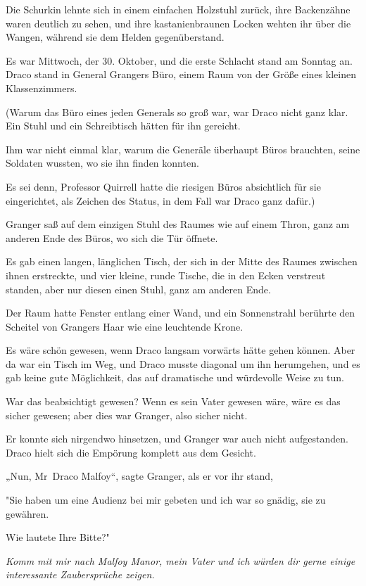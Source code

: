 {Die Schurkin lehnte sich in einem einfachen Holzstuhl zurück, ihre Backenzähne waren deutlich zu sehen, und ihre kastanienbraunen Locken wehten ihr über die Wangen, während sie dem Helden gegenüberstand.

Es war Mittwoch, der 30. Oktober, und die erste Schlacht stand am Sonntag an. Draco stand in General Grangers Büro, einem Raum von der Größe eines kleinen Klassenzimmers.

(Warum das Büro eines jeden Generals so groß war, war Draco nicht ganz klar. Ein Stuhl und ein Schreibtisch hätten für ihn gereicht.

Ihm war nicht einmal klar, warum die Generäle überhaupt Büros brauchten, seine Soldaten wussten, wo sie ihn finden konnten.

Es sei denn, Professor Quirrell hatte die riesigen Büros absichtlich für sie eingerichtet, als Zeichen des Status, in dem Fall war Draco ganz dafür.)

Granger saß auf dem einzigen Stuhl des Raumes wie auf einem Thron, ganz am anderen Ende des Büros, wo sich die Tür öffnete.

Es gab einen langen, länglichen Tisch, der sich in der Mitte des Raumes zwischen ihnen erstreckte, und vier kleine, runde Tische, die in den Ecken verstreut standen, aber nur diesen einen Stuhl, ganz am anderen Ende.

Der Raum hatte Fenster entlang einer Wand, und ein Sonnenstrahl berührte den Scheitel von Grangers Haar wie eine leuchtende Krone.

Es wäre schön gewesen, wenn Draco langsam vorwärts hätte gehen können. Aber da war ein Tisch im Weg, und Draco musste diagonal um ihn herumgehen, und es gab keine gute Möglichkeit, das auf dramatische und würdevolle Weise zu tun.

War das beabsichtigt gewesen? Wenn es sein Vater gewesen wäre, wäre es das sicher gewesen; aber dies war Granger, also sicher nicht.

Er konnte sich nirgendwo hinsetzen, und Granger war auch nicht aufgestanden. Draco hielt sich die Empörung komplett aus dem Gesicht.

„Nun, Mr~Draco Malfoy“, sagte Granger, als er vor ihr stand,

"Sie haben um eine Audienz bei mir gebeten und ich war so gnädig, sie zu gewähren.

Wie lautete Ihre Bitte?"

\emph{Komm mit mir nach Malfoy Manor, mein Vater und ich würden dir gerne einige interessante Zaubersprüche zeigen.}

}
